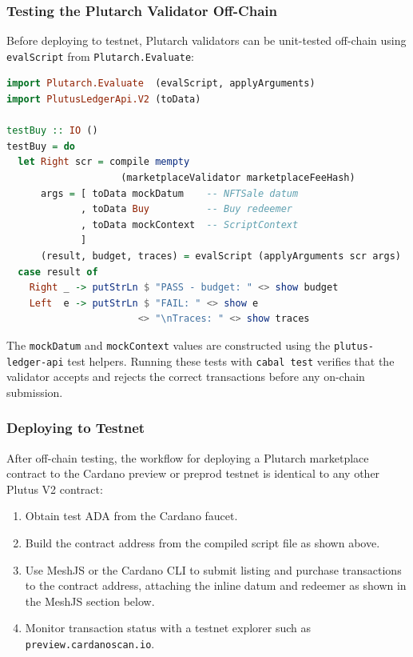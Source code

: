 \subsubsection{Testing the Plutarch Validator Off-Chain}

Before deploying to testnet, Plutarch validators can be unit-tested off-chain using \texttt{evalScript} from \texttt{Plutarch.Evaluate}:

\begin{lstlisting}[language=haskell, caption=Off-Chain Testing of the Plutarch Marketplace Validator]
import Plutarch.Evaluate  (evalScript, applyArguments)
import PlutusLedgerApi.V2 (toData)

testBuy :: IO ()
testBuy = do
  let Right scr = compile mempty
                    (marketplaceValidator marketplaceFeeHash)
      args = [ toData mockDatum    -- NFTSale datum
             , toData Buy          -- Buy redeemer
             , toData mockContext  -- ScriptContext
             ]
      (result, budget, traces) = evalScript (applyArguments scr args)
  case result of
    Right _ -> putStrLn $ "PASS - budget: " <> show budget
    Left  e -> putStrLn $ "FAIL: " <> show e
                       <> "\nTraces: " <> show traces
\end{lstlisting}

The \texttt{mockDatum} and \texttt{mockContext} values are constructed using the \texttt{plutus-ledger-api} test helpers. Running these tests with \texttt{cabal test} verifies that the validator accepts and rejects the correct transactions before any on-chain submission.

\subsubsection{Deploying to Testnet}

After off-chain testing, the workflow for deploying a Plutarch marketplace contract to the Cardano preview or preprod testnet is identical to any other Plutus V2 contract:

\begin{enumerate}
    \item Obtain test ADA from the Cardano faucet.
    \item Build the contract address from the compiled script file as shown above.
    \item Use MeshJS or the Cardano CLI to submit listing and purchase transactions to the contract address, attaching the inline datum and redeemer as shown in the MeshJS section below.
    \item Monitor transaction status with a testnet explorer such as \texttt{preview.cardanoscan.io}.
\end{enumerate}

